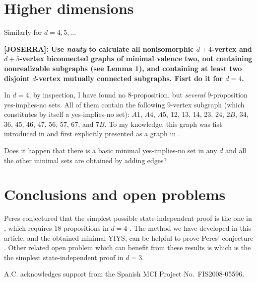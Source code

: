 \documentclass[twocolumn,aps,pra,showpacs]{revtex4-1}
\begin{document}

\section{Higher dimensions}


Similarly for $d=4,5,\ldots$

{\bf [JOSERRA]: Use {\em nauty} to calculate all nonisomorphic
$d+4$-vertex and $d+5$-vertex biconnected graphs of minimal
valence two, not containing nonrealizable subgraphs (see Lemma
1), and containing at least two disjoint $d$-vertex mutually
connected subgraphs. Fisrt do it for $d=4$.}

In $d=4$, by inspection, I have found no $8$-proposition, but
{\em several} $9$-proposition yes-implies-no sets. All of them
contain the following $9$-vertex subgraph (which constitutes by
itself a yes-implies-no set): $A1$, $A4$, $A5$, 12, 13, 14, 23,
24, $2B$, 34, 36, 45, 46, 47, 56, 57, 67, and $7B$. To my
knowledge, this graph was fist introduced in \cite{CEG96} and
first explicitly presented as a graph in \cite{Cabello96}.

Does it happen that there is a basic minimal yes-implies-no set
in any $d$ and all the other minimal sets are obtained by
adding edges?


\section{Conclusions and open problems}


Peres conjectured that the simplest possible state-independent
proof is the one in \cite{CEG96}, which requires 18
propositions in $d=4$ \cite{Peres03}. The method we have
developed in this article, and the obtained minimal YIYS, can
be helpful to prove Peres' conjecture \cite{CPP10}. Other
related open problem which can benefit from these results is
which is the the simplest state-independent proof in $d=3$.


\begin{acknowledgments}
A.C. acknowledges support from the Spanish MCI Project No.\
FIS2008-05596.
\end{acknowledgments}
\end{document}
